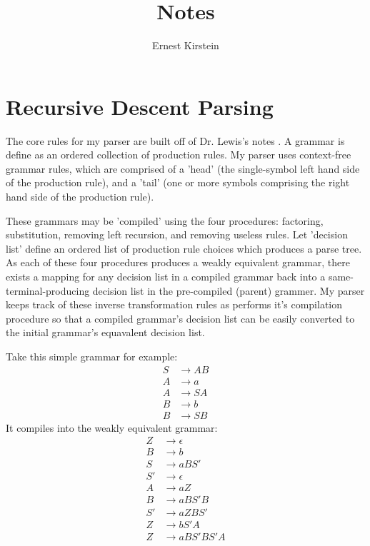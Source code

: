 \documentclass[11pt]{article}
\begin{document}
\title{Notes}
\author{Ernest Kirstein}
\maketitle

\section*{Recursive Descent Parsing}

The core rules for my parser are built off of Dr. Lewis's notes \cite{lewis}.
A grammar is define as an ordered collection of production rules.
My parser uses context-free grammar rules, which are comprised of a
'head' (the single-symbol left hand side of the production rule), and a 'tail'
(one or more symbols comprising the right hand side of the production rule).

These grammars may be 'compiled' using the four procedures:
factoring, substitution, removing left recursion, and removing useless
rules. Let 'decision list' define an ordered list of production rule
choices which produces a parse tree.
As each of these four procedures produces a weakly equivalent grammar,
there exists a mapping for any decision list in a compiled grammar
back into a same-terminal-producing decision list in the pre-compiled (parent) grammer.
My parser keeps track of these inverse transformation rules as performs
it's compilation procedure so that a compiled grammar's decision list can be easily
converted to the initial grammar's equavalent decision list. 

Take this simple grammar for example:
\begin{align}
S &\rightarrow A B\\
A &\rightarrow a\\
A &\rightarrow S A\\
B &\rightarrow b\\
B &\rightarrow S B
\end{align}
It compiles into the weakly equivalent grammar:
\setcounter{equation}{0}
\begin{align}
Z &\rightarrow \epsilon\\
B &\rightarrow b\\
S &\rightarrow a B S'\\
S' &\rightarrow \epsilon\\
A &\rightarrow a Z\\
B &\rightarrow a B S' B\\
S' &\rightarrow a Z B S'\\
Z &\rightarrow b S' A\\
Z &\rightarrow a B S' B S' A
\end{align}
\end{document}

